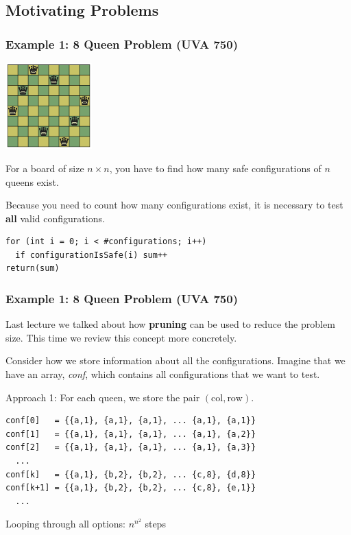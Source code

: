 \subsection{Motivating Problems}


\begin{frame}[fragile]
  \frametitle{Example 1: 8 Queen Problem (UVA 750)}
  \includegraphics[width=0.25\textwidth]{../img/8queen}\\

  For a board of size $n \times n$, you have to find \alert{how many} safe
  configurations of $n$ queens exist.
  \bigskip

  Because you need to count \alert{how many} configurations exist, it is
  necessary to test {\bf all} valid configurations.

  \bigskip

\begin{verbatim}
for (int i = 0; i < #configurations; i++)
  if configurationIsSafe(i) sum++
return(sum)
\end{verbatim}
\end{frame}

\begin{frame}[fragile]
  \frametitle{Example 1: 8 Queen Problem (UVA 750)}

  Last lecture we talked about how {\bf pruning} can be used to reduce the problem size. This time we review this concept more concretely.\bigskip

  Consider how we store information about all the configurations. Imagine that we have an array, \emph{conf}, which contains all configurations that we want to test.
  \bigskip

  Approach 1: For each queen, we store the pair $(\text{col},\text{row})$.
\begin{verbatim}
conf[0]   = {{a,1}, {a,1}, {a,1}, ... {a,1}, {a,1}}
conf[1]   = {{a,1}, {a,1}, {a,1}, ... {a,1}, {a,2}}
conf[2]   = {{a,1}, {a,1}, {a,1}, ... {a,1}, {a,3}}
  ...
conf[k]   = {{a,1}, {b,2}, {b,2}, ... {c,8}, {d,8}}
conf[k+1] = {{a,1}, {b,2}, {b,2}, ... {c,8}, {e,1}}
  ...
\end{verbatim}

Looping through all options: $n^{n^2}$ steps
\end{frame}

